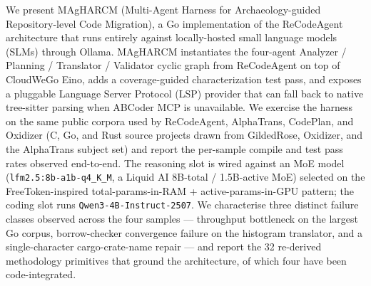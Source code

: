 We present MAgHARCM (Multi-Agent Harness for Archaeology-guided Repository-level Code Migration), a Go implementation of the ReCodeAgent architecture that runs entirely against locally-hosted small language models (SLMs) through Ollama. MAgHARCM instantiates the four-agent Analyzer / Planning / Translator / Validator cyclic graph from ReCodeAgent on top of CloudWeGo Eino, adds a coverage-guided characterization test pass, and exposes a pluggable Language Server Protocol (LSP) provider that can fall back to native tree-sitter parsing when ABCoder MCP is unavailable. We exercise the harness on the same public corpora used by ReCodeAgent, AlphaTrans, CodePlan, and Oxidizer (C, Go, and Rust source projects drawn from GildedRose, Oxidizer, and the AlphaTrans subject set) and report the per-sample compile and test pass rates observed end-to-end. The reasoning slot is wired against an MoE model (\texttt{lfm2.5:8b-a1b-q4\_K\_M}, a Liquid AI 8B-total / 1.5B-active MoE) selected on the FreeToken-inspired total-params-in-RAM + active-params-in-GPU pattern; the coding slot runs \texttt{Qwen3-4B-Instruct-2507}. We characterise three distinct failure classes observed across the four samples --- throughput bottleneck on the largest Go corpus, borrow-checker convergence failure on the histogram translator, and a single-character cargo-crate-name repair --- and report the 32 re-derived methodology primitives that ground the architecture, of which four have been code-integrated.
